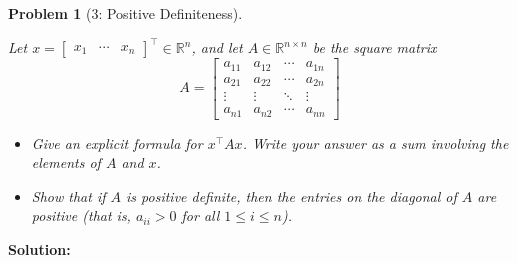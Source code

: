 \documentclass[11pt]{exam}
\theoremstyle{quest}
\newtheorem*{question}{Problem}
\begin{document}
\begin{question}[3: Positive Definiteness]
~

Let $x = \begin{bmatrix}x_1 & \cdots & x_n\end{bmatrix}^\top \in \mathbb{R}^n$,
and let $A \in \mathbb{R}^{n \times n}$ be the square matrix
\begin{equation*}
A = \begin{bmatrix}
  a_{11} & a_{12} & \cdots & a_{1n} \\
  a_{21} & a_{22} & \cdots & a_{2n} \\
  \vdots  & \vdots  & \ddots & \vdots  \\
  a_{n1} & a_{n2} & \cdots & a_{nn}
\end{bmatrix}
\end{equation*}

\begin{itemize}
\item[(a)] Give an explicit formula for $x^\top A x$. Write your answer as a sum
  involving the elements of $A$ and $x$.
\item[(b)] Show that if $A$ is positive definite, then the entries on the
  diagonal of $A$ are positive (that is, $a_{ii} > 0$ for all
  $1 \leq i \leq n$).
\end{itemize}
\end{question}
\textbf{Solution:}
\end{document}
